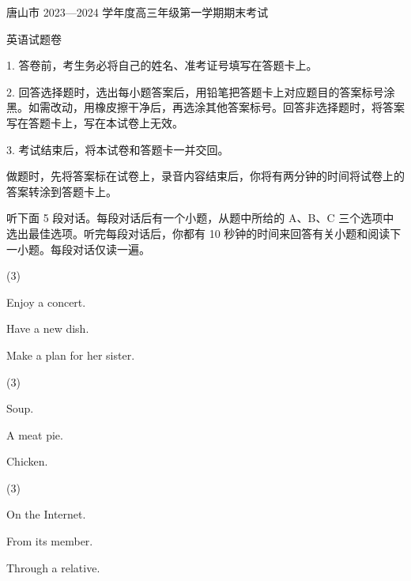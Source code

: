 \documentclass{英语试卷}
\begin{document}
\par 唐山市 2023—2024 学年度高三年级第一学期期末考试\par
\par 英语试题卷\par
\begin{notice}
\par 1. 答卷前，考生务必将自己的姓名、准考证号填写在答题卡上。\par
\par 2. 回答选择题时，选出每小题答案后，用铅笔把答题卡上对应题目的答案标号涂黑。如需改动，用橡皮擦干净后，再选涂其他答案标号。回答非选择题时，将答案写在答题卡上，写在本试卷上无效。\par
\par 3. 考试结束后，将本试卷和答题卡一并交回。\par
\end{notice}
\par 做题时，先将答案标在试卷上，录音内容结束后，你将有两分钟的时间将试卷上的答案转涂到答题卡上。\par
{}
\par 听下面 5 段对话。每段对话后有一个小题，从题中所给的 A、B、C 三个选项中选出最佳选项。听完每段对话后，你都有 10 秒钟的时间来回答有关小题和阅读下一小题。每段对话仅读一遍。\par
{}
\begin{choices}(3)
  \item Enjoy a concert.
  \item Have a new dish.
  \item Make a plan for her sister.
\end{choices}
\begin{choices}(3)
  \item Soup.
  \item A meat pie.
  \item Chicken.
\end{choices}
\begin{choices}(3)
  \item On the Internet.
  \item From its member.
  \item Through a relative.
\end{choices}
\end{document}
